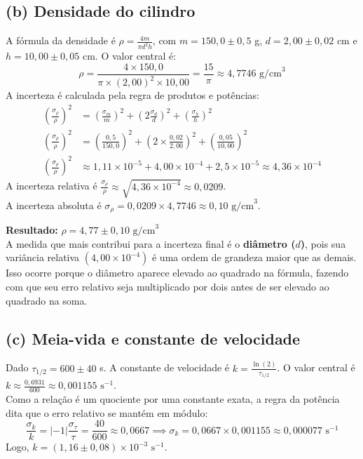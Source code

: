 \documentclass{article}
\begin{document}
\subsection*{(b) Densidade do cilindro}
A fórmula da densidade é $\rho = \frac{4m}{\pi d^2 h}$, com $m = 150,0 \pm 0,5$ g, $d = 2,00 \pm 0,02$ cm e $h = 10,00 \pm 0,05$ cm. 
O valor central é:
\[ \rho = \frac{4 \times 150,0}{\pi \times (2,00)^2 \times 10,00} = \frac{15}{\pi} \approx 4,7746 \text{ g/cm}^3 \]
A incerteza é calculada pela regra de produtos e potências:
\begin{align*}
    \left(\frac{\sigma_\rho}{\rho}\right)^2 &= \left(\frac{\sigma_m}{m}\right)^2 + \left(2\frac{\sigma_d}{d}\right)^2 + \left(\frac{\sigma_h}{h}\right)^2 \\
    \left(\frac{\sigma_\rho}{\rho}\right)^2 &= \left(\frac{0,5}{150,0}\right)^2 + \left(2 \times \frac{0,02}{2,00}\right)^2 + \left(\frac{0,05}{10,00}\right)^2 \\
    \left(\frac{\sigma_\rho}{\rho}\right)^2 &\approx 1,11 \times 10^{-5} + 4,00 \times 10^{-4} + 2,5 \times 10^{-5} \approx 4,36 \times 10^{-4}
\end{align*}
A incerteza relativa é $\frac{\sigma_\rho}{\rho} \approx \sqrt{4,36 \times 10^{-4}} \approx 0,0209$. \\
A incerteza absoluta é $\sigma_\rho = 0,0209 \times 4,7746 \approx 0,10 \text{ g/cm}^3$.

\textbf{Resultado:} $\rho = 4,77 \pm 0,10 \text{ g/cm}^3$ \\
A medida que mais contribui para a incerteza final é o \textbf{diâmetro ($d$)}, pois sua variância relativa $(4,00 \times 10^{-4})$ é uma ordem de grandeza maior que as demais. Isso ocorre porque o diâmetro aparece elevado ao quadrado na fórmula, fazendo com que seu erro relativo seja multiplicado por dois antes de ser elevado ao quadrado na soma.

\subsection*{(c) Meia-vida e constante de velocidade}
Dado $\tau_{1/2} = 600 \pm 40$ s. A constante de velocidade é $k = \frac{\ln(2)}{\tau_{1/2}}$.
O valor central é $k \approx \frac{0,6931}{600} \approx 0,001155 \text{ s}^{-1}$. \\
Como a relação é um quociente por uma constante exata, a regra da potência dita que o erro relativo se mantém em módulo:
\[ \frac{\sigma_k}{k} = |-1| \frac{\sigma_\tau}{\tau} = \frac{40}{600} \approx 0,0667 \implies \sigma_k = 0,0667 \times 0,001155 \approx 0,000077 \text{ s}^{-1} \]
Logo, $k = (1,16 \pm 0,08) \times 10^{-3} \text{ s}^{-1}$.
\end{document}
